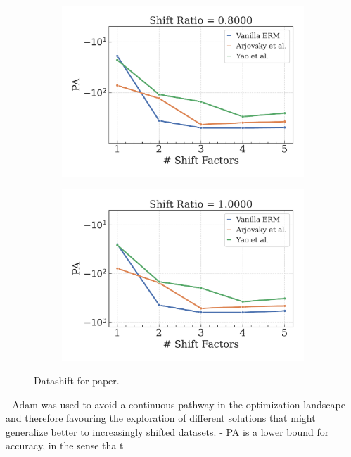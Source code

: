 \begin{figure}[H]
    \begin{subfigure}[b]{0.3\textwidth}
        \centering
        \includegraphics[width=\textwidth]{img/results_discussion/datashift/shift_ratio=0.800.pdf}
    \end{subfigure}
    \hspace{13pt}
    \begin{subfigure}[b]{0.3\textwidth}
        \centering
        \includegraphics[width=\textwidth]{img/results_discussion/datashift/shift_ratio=1.000.pdf}
    \end{subfigure}

    \caption{Datashift for paper.}
    \label{fig:six_figures}
\end{figure}

- Adam was used to avoid a continuous pathway in the optimization landscape and therefore favouring the exploration of different solutions that might generalize better to increasingly shifted datasets.
- PA is a lower bound for accuracy, in the sense tha t

